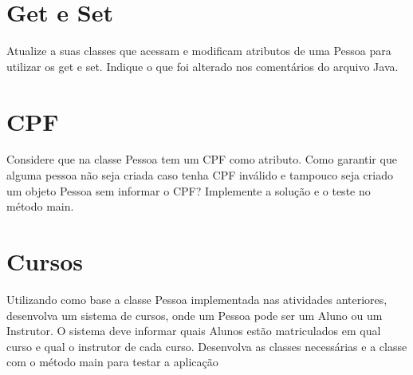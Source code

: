 \documentclass[12pt,a4paper, brazil]{article}
\begin{document}
\section{Get e Set}
 \par
 Atualize a suas classes que acessam e modificam atributos de uma Pessoa para utilizar os get e set. Indique o que foi alterado nos comentários do arquivo Java.
 
 \dotfill

\section{CPF} 
\par
Considere que na classe Pessoa tem um CPF como atributo. Como garantir que alguma pessoa não seja criada caso tenha CPF inválido e tampouco seja criado um objeto Pessoa sem informar o CPF? Implemente a solução e o teste no método main.

\dotfill

\section{Cursos}
\par
Utilizando como base a classe Pessoa implementada nas atividades anteriores, desenvolva um sistema de cursos, onde um Pessoa pode ser um Aluno ou um Instrutor.
O sistema deve informar quais Alunos estão matriculados em qual curso e qual o instrutor de cada curso.
Desenvolva as classes necessárias e a classe com o método main para testar a aplicação
 
\end{document}
